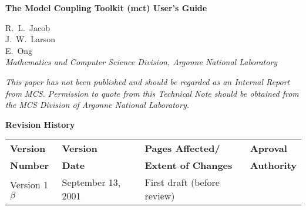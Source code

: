 \documentclass{article}
\begin{document}
\begin{sloppypar}
{\huge\bf
The Model Coupling Toolkit (mct) User's Guide
\\ }                     %
\end{sloppypar}

\vspace{.3in}
             R.~L.~Jacob\\
             J.~W.~Larson\\
             E.~Ong\\
\vspace{.2in} {\em Mathematics and Computer Science Division,
Argonne National Laboratory\\}

\vfill

{\em This paper has not been published and should  be regarded as
an Internal Report from MCS. Permission to quote from this
Technical Note should be  obtained from the MCS Division of
Argonne National Laboratory.}

\vspace{0.4in}


\thispagestyle{empty}
\newpage




\newpage
\setcounter{page}{2}     %


\vspace*{\fill}

\centerline{\huge\bf Revision History}

\bigskip
{}

\begin{center}
\begin{tabular}{|l|l|l|l|}\hline
{\bf Version} & {\bf Version} & {\bf Pages Affected/}   & {\bf Aproval}\\
{\bf Number}  & {\bf Date}    & {\bf Extent of Changes} & {\bf Authority}\\
\hline\hline Version 1$\beta$ & September 13, 2001      & First
draft (before review) &\\\hline
\end{tabular}
\end{center}
\end{document}
